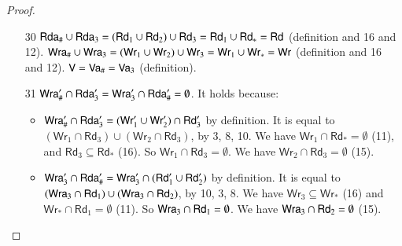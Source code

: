 \documentclass{llncs}
\newcommand{\readset}{\mathsf{Rd}}
\newcommand{\valuset}{\mathsf{V}}
\newcommand{\writeset}{\mathsf{Wr}}
\begin{document}
\begin{proof}
\begin{itemize}
\begin{itemize}
  \item[30]
$\readseta_\# \cup \readseta_3 = (\readset_1 \cup \readset_2) \cup \readset_3 = \readset_1 \cup \readset_* = \readset$ (definition and 16 and 12).
    $\writeseta_\# \cup \writeseta_3 = (\writeset_1 \cup \writeset_2) \cup \writeset_3 = \writeset_1 \cup \writeset_* = \writeset$ (definition and 16 and 12).
    $\valuset = \valuseta_\# = \valuseta_3$ (definition).
    
  \item[31] $\mathsf {Wra}'_\# \cap \mathsf {Rda}'_3 = \mathsf {Wra}'_3 \cap \mathsf {Rda}'_\# = \emptyset$. It holds because:
    \begin{itemize}
    \item $\writeseta'_\# \cap \readseta'_3 = (\writeset'_1 \cup \writeset'_2) \cap \readset'_3$ by definition. It is equal to $(\writeset_1 \cap \readset_3) \cup (\writeset_2 \cap \readset_3)$, by 3, 8, 10. We have $\writeset_1 \cap \readset_* = \emptyset$ (11), and $\readset_3 \subseteq \readset_*$ (16). So $\writeset_1 \cap \readset_3 = \emptyset$.
      We have $\writeset_2 \cap \readset_3 = \emptyset$ (15).
    \item $\writeseta'_3 \cap \readseta'_\# = \writeseta'_3 \cap (\readset'_1 \cup \readset'_2)$ by definition. It is equal to $(\writeseta_3 \cap \readset_1) \cup (\writeseta_3 \cap \readset_2)$, by 10, 3, 8. We have $\writeset_3 \subseteq \writeset_*$ (16) and $\writeset_* \cap \readset_1 = \emptyset$ (11).
      So $\writeseta_3 \cap \readset_1 = \emptyset$.
      We have $\writeseta_3 \cap \readset_2 = \emptyset$ (15).
    \end{itemize}


\end{itemize}
\end{itemize}
\end{proof}
\end{document}
